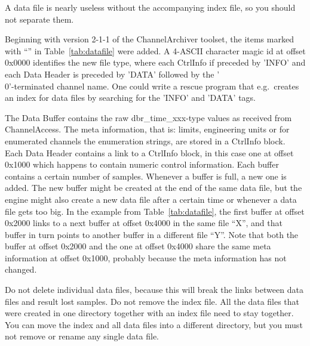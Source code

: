  A data file is nearly useless without the
accompanying index file, so you should not separate them.

Beginning with version 2-1-1 of the ChannelArchiver toolset, the items
marked with ``\dag'' in Table~\ref{tab:datafile} were added.
A 4-ASCII character magic id at offset 0x0000 identifies the new file
type, where each CtrlInfo if preceded by 'INFO' and each Data Header
is preceded by 'DATA' followed by the '\\0'-terminated channel name.
One could write a rescue program
that e.g.\ creates an index for data files by searching for the 'INFO'
and 'DATA' tags.

\noindent The Data Buffer contains the raw dbr\_time\_xxx-type values
as received from ChannelAccess. The meta information, that is: limits,
engineering units or for enumerated channels the enumeration strings,
are stored in a CtrlInfo block. Each Data Header contains a link to a
CtrlInfo block, in this case one at offset 0x1000 which happens to
contain numeric control information.
Each buffer contains a certain number of samples. Whenever a buffer is
full, a new one is added. The new buffer might be created at the end
of the same data file, but the engine might also create a new data
file after a certain time or whenever a data file gets too big.
In the example from Table~\ref{tab:datafile}, the first buffer at offset
0x2000 links to a next buffer at offset 0x4000 in the same file ``X'',
and that buffer in turn points to another buffer in a different file
``Y''. Note that both the buffer at offset 0x2000 and the one at
offset 0x4000 share the same meta information at offset 0x1000,
probably because the meta information has not changed.

 Do not delete individual data
files, because this will break the links between data files and result
lost samples. Do not remove the index file. All the data files that were
created in one directory together with an index file need to stay together.
You can move the index and all data files into a different directory, but
you must not remove or rename any single data file.


